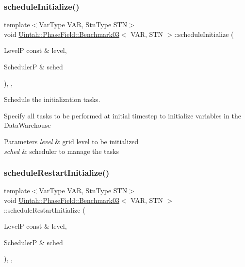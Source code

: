 \subsubsection{\texorpdfstring{schedule\+Initialize()}{scheduleInitialize()}}
{\footnotesize\ttfamily template$<$Var\+Type V\+AR, Stn\+Type S\+TN$>$ \\
void \hyperlink{classUintah_1_1PhaseField_1_1Benchmark03}{Uintah\+::\+Phase\+Field\+::\+Benchmark03}$<$ V\+AR, S\+TN $>$\+::schedule\+Initialize (\begin{DoxyParamCaption}\item[{LevelP const \&}]{level,  }\item[{SchedulerP \&}]{sched }\end{DoxyParamCaption})\hspace{0.3cm}{\ttfamily [override]}, {\ttfamily [protected]}, {\ttfamily [virtual]}}



Schedule the initialization tasks. 

Specify all tasks to be performed at initial timestep to initialize variables in the Data\+Warehouse


\begin{DoxyParams}{Parameters}
{\em level} & grid level to be initialized \\
\hline
{\em sched} & scheduler to manage the tasks \\
\hline
\end{DoxyParams}
\mbox{\label{classUintah_1_1PhaseField_1_1Benchmark03_abcaca760998f8456529825bd35470deb}} 
\subsubsection{\texorpdfstring{schedule\+Restart\+Initialize()}{scheduleRestartInitialize()}}
{\footnotesize\ttfamily template$<$Var\+Type V\+AR, Stn\+Type S\+TN$>$ \\
void \hyperlink{classUintah_1_1PhaseField_1_1Benchmark03}{Uintah\+::\+Phase\+Field\+::\+Benchmark03}$<$ V\+AR, S\+TN $>$\+::schedule\+Restart\+Initialize (\begin{DoxyParamCaption}\item[{LevelP const \&}]{level,  }\item[{SchedulerP \&}]{sched }\end{DoxyParamCaption})\hspace{0.3cm}{\ttfamily [override]}, {\ttfamily [protected]}, {\ttfamily [virtual]}}



